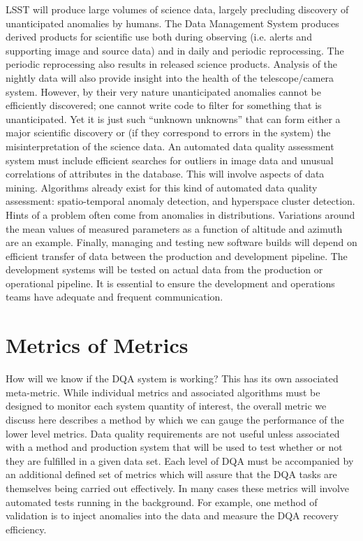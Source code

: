 \documentclass[SE,toc,lsstdraft]{lsstdoc}
\newcommand{\newtext}[1]{{\color{blue} #1}}
\begin{document}
LSST will produce large volumes of science data, largely precluding discovery of unanticipated anomalies by humans.  The Data Management System produces derived products for scientific use both during observing (i.e. alerts and supporting image and source data) and in daily and periodic reprocessing.  The periodic reprocessing also results in released science products. Analysis of the nightly data will also provide insight into the health of the telescope/camera system.  However, by their very nature unanticipated anomalies cannot be efficiently discovered; one cannot write code to filter for something that is unanticipated. Yet it is just such ``unknown unknowns'' that can form either a major scientific discovery or (if they correspond to errors in the system) the misinterpretation of the science data.  An automated data quality assessment system must include efficient searches for outliers in image data and unusual correlations of attributes in the database. This will involve aspects of data mining.  Algorithms already exist for this kind of automated data quality assessment: spatio-temporal anomaly detection, and hyperspace cluster detection.
Hints of a problem often come from anomalies in distributions.  Variations around the mean values of measured parameters as a function of altitude and azimuth are an example.
Finally, managing and testing new software builds will depend on efficient transfer of data between the production and development pipeline. The development systems will be tested on actual data from the production or operational pipeline. It is essential to ensure the development and operations teams have adequate and frequent communication.

\section{Metrics of Metrics}

How will we know if the DQA system is working? This has its own associated meta-metric. While individual metrics and associated algorithms must be designed to monitor each system quantity of interest, the overall metric we discuss here describes a method by which we can gauge the performance of the lower level metrics.
Data quality requirements are not useful unless associated with a
method and production system that will be used to test whether or not they are fulfilled in
a given data set. Each level of DQA must be accompanied by an additional defined set of metrics which will assure that
the DQA tasks are themselves being carried out effectively. In many cases these metrics will involve
automated tests running in the background.
\newtext{For example, one method of validation is to inject anomalies into the data and measure the DQA recovery efficiency.}
\end{document}
